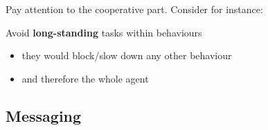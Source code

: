 \documentclass{beamer}\mode<presentation>{\usetheme{AMSCesenaPurpleAndGold}}
\begin{document}
\begin{frame}[allowframebreaks]
    \framebreak

    Pay attention to the \alert{cooperative} part. Consider for instance:
    

    \bigskip

    \begin{alertblock}{Avoid \textbf{long-standing} tasks within behaviours}
        \begin{itemize}
            \item they would block/slow down any other behaviour
            \item and therefore the whole agent
        \end{itemize}
    \end{alertblock}

\end{frame}

\subsection{\jade{} Messaging}
\end{document}
